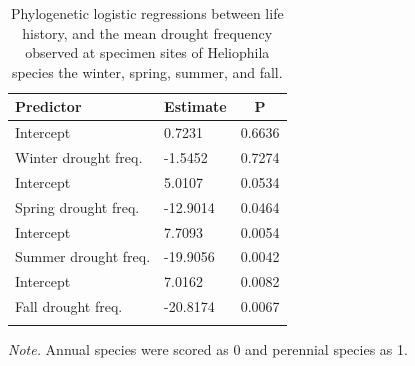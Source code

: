 \documentclass[man,floatsintext]{apa6}
\theoremstyle{definition}
\theoremstyle{definition}
\theoremstyle{definition}
\theoremstyle{remark}
\begin{document}
\begin{table}[tbp]
\begin{center}
\begin{threeparttable}
\caption{\label{tab:modelstable}Phylogenetic logistic regressions between life history, and the mean drought frequency observed at specimen sites of Heliophila species the winter, spring, summer, and fall.}
\begin{tabular}{lll}
\toprule
Predictor & \multicolumn{1}{c}{Estimate} & \multicolumn{1}{c}{P}\\
\midrule
Intercept & 0.7231 & 0.6636\\
Winter drought freq. & -1.5452 & 0.7274\\ \midrule
Intercept & 5.0107 & 0.0534\\
Spring drought freq. & -12.9014 & 0.0464\\ \midrule
Intercept & 7.7093 & 0.0054\\
Summer drought freq. & -19.9056 & 0.0042\\ \midrule
Intercept & 7.0162 & 0.0082\\
Fall drought freq. & -20.8174 & 0.0067\\ \midrule
\bottomrule
\addlinespace
\end{tabular}
\begin{tablenotes}[para]
\normalsize{\textit{Note.} Annual species were scored as 0 and perennial species as 1.}
\end{tablenotes}
\end{threeparttable}
\end{center}
\end{table}
\end{document}
